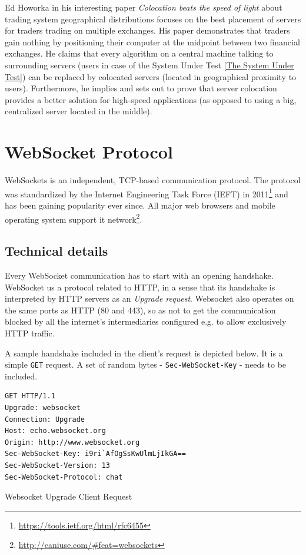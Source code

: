 \documentclass{uvamscse}
\begin{document}
Ed Howorka in his interesting paper \textit{Colocation beats the speed of light} \cite{EdHoColoc}  about trading system geographical distributions focuses on the best placement of servers for traders trading on multiple exchanges. His paper demonstrates that traders gain nothing by positioning their computer at the midpoint between two financial exchanges. He claims that  every algorithm on a central machine talking to surrounding servers (users in case of the System Under Test \ref{The System Under Test}) can be replaced by colocated servers (located in geographical proximity to users). Furthermore, he implies and sets out to prove that server colocation provides a better solution for high-speed applications (as opposed to using a big, centralized server located in the middle).


\section{WebSocket Protocol}\label{Websocket Protocol}

WebSockets is an independent, TCP-based communication protocol. The protocol was standardized by the Internet Engineering Task Force (IEFT) in 2011\footnote{\url{https://tools.ietf.org/html/rfc6455}} and has been gaining popularity ever since. All major web browsers and mobile operating system support it network\footnote{\url{http://caniuse.com/\#feat=websockets}}.

\subsection{Technical details}

Every WebSocket communication has to start with an opening handshake. WebSocket us a protocol related to HTTP, in a sense that its handshake is interpreted by HTTP servers as an \textit{Upgrade request}. Websocket also operates on the same ports as HTTP (80 and 443), so as not to get the communication blocked by all the internet's intermediaries configured e.g. to allow exclusively HTTP traffic.

A sample handshake included in the client's request is depicted below. It is a simple \texttt{GET} request. A set of random bytes - \texttt{Sec-WebSocket-Key} - needs to be included.

\begin{sourcecode}
\begin{lstlisting}[style=mono]
GET HTTP/1.1
Upgrade: websocket
Connection: Upgrade
Host: echo.websocket.org
Origin: http://www.websocket.org
Sec-WebSocket-Key: i9ri`AfOgSsKwUlmLjIkGA==
Sec-WebSocket-Version: 13
Sec-WebSocket-Protocol: chat
\end{lstlisting}
\caption{Websocket Upgrade Client Request}
\end{sourcecode}
\end{document}
